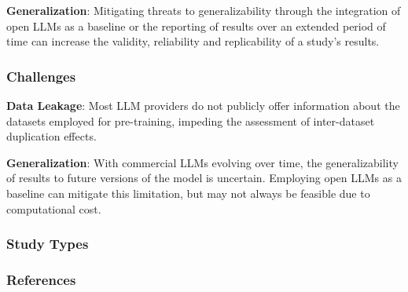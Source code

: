 \textbf{Generalization}:
Mitigating threats to generalizability through the integration of open LLMs as a baseline or the reporting of results over an extended period of time can increase the validity, reliability and replicability of a study's results.



\subsubsection{Challenges}
\textbf{Data Leakage}:
Most LLM providers do not publicly offer information about the datasets employed for pre-training, impeding the assessment of inter-dataset duplication effects.

\textbf{Generalization}:
With commercial LLMs evolving over time, the generalizability of results to future versions of the model is uncertain. Employing open LLMs as a baseline can mitigate this limitation, but may not always be feasible due to computational cost.




\subsubsection{Study Types}


\subsubsection{References}





